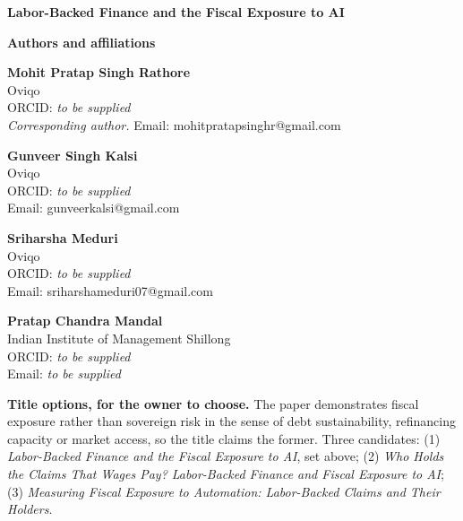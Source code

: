 \documentclass[11pt]{article}
\begin{document}
\begin{center}
{\LARGE\bfseries Labor-Backed Finance and the Fiscal Exposure to AI}
\end{center}

\vspace{1.5em}

\noindent\textbf{Authors and affiliations}

\vspace{0.5em}

\noindent
\textbf{Mohit Pratap Singh Rathore}\\
Oviqo\\
ORCID: \textit{to be supplied}\\
\textit{Corresponding author.} Email: mohitpratapsinghr@gmail.com

\vspace{0.8em}

\noindent
\textbf{Gunveer Singh Kalsi}\\
Oviqo\\
ORCID: \textit{to be supplied}\\
Email: gunveerkalsi@gmail.com

\vspace{0.8em}

\noindent
\textbf{Sriharsha Meduri}\\
Oviqo\\
ORCID: \textit{to be supplied}\\
Email: sriharshameduri07@gmail.com

\vspace{0.8em}

\noindent
\textbf{Pratap Chandra Mandal}\\
Indian Institute of Management Shillong\\
ORCID: \textit{to be supplied}\\
Email: \textit{to be supplied}

\vspace{1em}

\noindent\textbf{Title options, for the owner to choose.} The paper demonstrates fiscal
exposure rather than sovereign risk in the sense of debt sustainability, refinancing capacity or
market access, so the title claims the former. Three candidates:
(1) \textit{Labor-Backed Finance and the Fiscal Exposure to AI}, set above;
(2) \textit{Who Holds the Claims That Wages Pay? Labor-Backed Finance and Fiscal Exposure to
AI};
(3) \textit{Measuring Fiscal Exposure to Automation: Labor-Backed Claims and Their Holders}.
\end{document}

